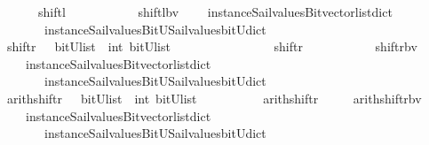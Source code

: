 \begin{isabellebody}
\ \ \ \ \ {\isachardoublequoteopen}\ shiftl\ \ \ \ \ \ \ {\isacharequal}\ {\isacharparenleft}\ \isanewline
\ \ shiftl{\isacharunderscore}bv\isanewline
\ \ \ \ {\isacharparenleft}instance{\isacharunderscore}Sail{}{\isacharunderscore}values{\isacharunderscore}Bitvector{\isacharunderscore}list{\isacharunderscore}dict\isanewline
\ \ \ \ \ \ \ instance{\isacharunderscore}Sail{}{\isacharunderscore}values{\isacharunderscore}BitU{\isacharunderscore}Sail{}{\isacharunderscore}values{\isacharunderscore}bitU{\isacharunderscore}dict{\isacharparenright}\ {\isacharparenright}{\isachardoublequoteclose}\isanewline
\isanewline
{}\isamarkupfalse%
\ shiftr\ \ {\isacharcolon}{\isacharcolon}\ {\isachardoublequoteopen}{\isacharparenleft}bitU{\isacharparenright}list\ {\isasymRightarrow}\ int\ {\isasymRightarrow}{\isacharparenleft}bitU{\isacharparenright}list\ {\isachardoublequoteclose}\ \ \ \ \ \ \ \ \ \isanewline
\ \ \ \ \ {\isachardoublequoteopen}\ shiftr\ \ \ \ \ \ \ {\isacharequal}\ {\isacharparenleft}\ \isanewline
\ \ shiftr{\isacharunderscore}bv\isanewline
\ \ \ \ {\isacharparenleft}instance{\isacharunderscore}Sail{}{\isacharunderscore}values{\isacharunderscore}Bitvector{\isacharunderscore}list{\isacharunderscore}dict\isanewline
\ \ \ \ \ \ \ instance{\isacharunderscore}Sail{}{\isacharunderscore}values{\isacharunderscore}BitU{\isacharunderscore}Sail{}{\isacharunderscore}values{\isacharunderscore}bitU{\isacharunderscore}dict{\isacharparenright}\ {\isacharparenright}{\isachardoublequoteclose}\isanewline
\isanewline
{}\isamarkupfalse%
\ arith{\isacharunderscore}shiftr\ \ {\isacharcolon}{\isacharcolon}\ {\isachardoublequoteopen}{\isacharparenleft}bitU{\isacharparenright}list\ {\isasymRightarrow}\ int\ {\isasymRightarrow}{\isacharparenleft}bitU{\isacharparenright}list\ {\isachardoublequoteclose}\ \ \ \isanewline
\ \ \ \ \ {\isachardoublequoteopen}\ arith{\isacharunderscore}shiftr\ {\isacharequal}\ {\isacharparenleft}\ \isanewline
\ \ arith{\isacharunderscore}shiftr{\isacharunderscore}bv\isanewline
\ \ \ \ {\isacharparenleft}instance{\isacharunderscore}Sail{}{\isacharunderscore}values{\isacharunderscore}Bitvector{\isacharunderscore}list{\isacharunderscore}dict\isanewline
\ \ \ \ \ \ \ instance{\isacharunderscore}Sail{}{\isacharunderscore}values{\isacharunderscore}BitU{\isacharunderscore}Sail{}{\isacharunderscore}values{\isacharunderscore}bitU{\isacharunderscore}dict{\isacharparenright}\ {\isacharparenright}{\isachardoublequoteclose}\isanewline

\end{isabellebody}
